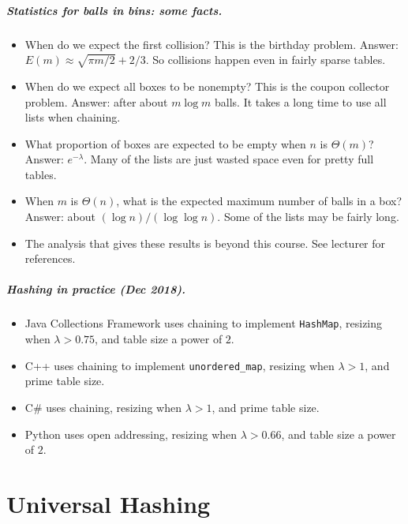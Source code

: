 \paragraph{Statistics for balls in bins: some facts.}
\begin{itemize}
\item When do we expect the first collision? This is the 
{birthday problem}. Answer: $E(m) \approx \sqrt{\pi m/2} + 2/3$.
So collisions happen even in fairly sparse tables.
\item When do we expect all boxes to be nonempty? This is the 
{coupon collector problem}. Answer: after about $m \log m$ balls. 
It takes a long time to use all lists when chaining.
\item What proportion of boxes are expected to be empty when $n$ is $\Theta(m)$? 
Answer: $e^{-\lambda}$. Many of the lists are just wasted space even for 
pretty full tables.
\item When $m$ is $\Theta(n)$, what is the expected maximum number of balls in a box? 
Answer: about $(\log n)/(\log \log n)$. Some of the lists may be fairly long. 
\item The analysis that gives these results is beyond this course. See lecturer for 
references.
\end{itemize}

\paragraph{Hashing in practice (Dec 2018).}
\begin{itemize}
\item Java Collections Framework uses chaining to implement \texttt{HashMap}, resizing when $\lambda > 0.75$, and table size a power of $2$.
\item C++  uses chaining to implement \texttt{unordered\_map}, resizing when $\lambda >1$, and prime table size.
\item C\# uses chaining, resizing when $\lambda >1$, and prime table size.
\item Python uses open addressing, resizing when $\lambda>0.66$, and table size a power of $2$.
\end{itemize}





\chapter{Universal Hashing} %


